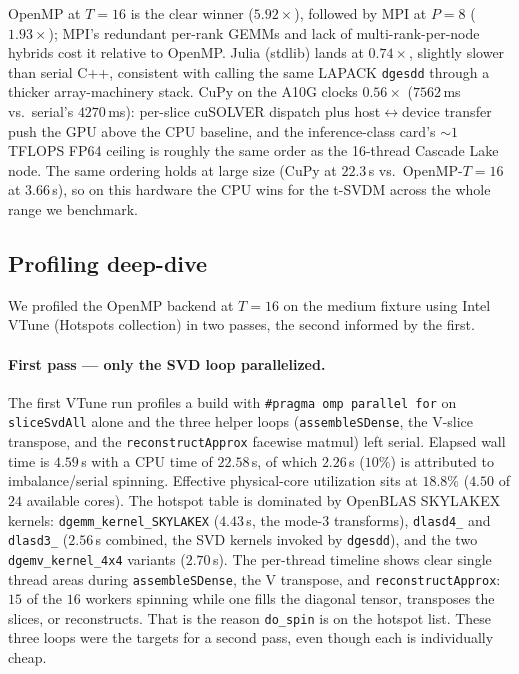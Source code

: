 \documentclass{article}
\begin{document}
OpenMP at $T=16$ is the clear winner ($5.92\times$), followed by MPI
at $P=8$ ($1.93\times$); MPI's redundant per-rank GEMMs and lack of
multi-rank-per-node hybrids cost it relative to OpenMP. Julia
(stdlib) lands at $0.74\times$, slightly slower than serial C++,
consistent with calling the same LAPACK \texttt{dgesdd} through a
thicker array-machinery stack. CuPy on the A10G clocks $0.56\times$
($7562$\,ms vs.\ serial's $4270$\,ms): per-slice cuSOLVER dispatch
plus host$\leftrightarrow$device transfer push the GPU above the CPU
baseline, and the inference-class card's $\sim 1$\,TFLOPS FP64 ceiling
is roughly the same order as the 16-thread Cascade Lake node.
The same ordering holds at large size (CuPy at $22.3$\,s vs.\
OpenMP-$T{=}16$ at $3.66$\,s), so on this hardware the CPU wins
for the t-SVDM across the whole range we benchmark.

\subsection{Profiling deep-dive}
\label{subsec:profiling}
We profiled the OpenMP backend at $T=16$ on the medium fixture using
Intel VTune (Hotspots collection) in two passes, the second informed
by the first.

\paragraph{First pass --- only the SVD loop parallelized.}
The first VTune run profiles a build with \texttt{\#pragma omp
parallel for} on \texttt{sliceSvdAll} alone and the three helper
loops (\texttt{assembleSDense}, the V-slice transpose, and the
\texttt{reconstructApprox} facewise matmul) left serial. Elapsed
wall time is $4.59$\,s with a CPU time of $22.58$\,s, of which
$2.26$\,s ($10\%$) is attributed to imbalance/serial spinning.
Effective physical-core utilization sits at $18.8\%$ ($4.50$ of
$24$ available cores). The hotspot table is dominated by OpenBLAS
SKYLAKEX kernels: \texttt{dgemm\_kernel\_SKYLAKEX} ($4.43$\,s,
the mode-3 transforms), \texttt{dlasd4\_} and \texttt{dlasd3\_}
($2.56$\,s combined, the SVD kernels invoked by
\texttt{dgesdd}), and the two \texttt{dgemv\_kernel\_4x4} variants
($2.70$\,s). The per-thread timeline shows clear single thread areas
during \texttt{assembleSDense}, the V transpose, and
\texttt{reconstructApprox}: $15$ of the $16$ workers spinning while
one fills the diagonal tensor, transposes the slices, or
reconstructs. That is the reason \texttt{do\_spin} is on the hotspot
list. These three loops were the targets for a second pass,
even though each is individually cheap.
\end{document}
